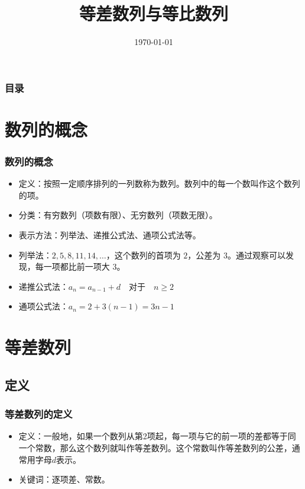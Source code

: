 \documentclass{ctexbeamer}
\title{等差数列与等比数列}
\date{\today}
\begin{document}
\begin{frame}
\titlepage
\end{frame}

\begin{frame}
\frametitle{目录}
\tableofcontents
\end{frame}

\section{数列的概念}
\begin{frame}
\frametitle{数列的概念}
\begin{itemize}
    \item 定义：按照一定顺序排列的一列数称为\alert{数列}。数列中的每一个数叫作这个数列的\alert{项}。
    \item 分类：\alert{有穷数列}（项数有限）、\alert{无穷数列}（项数无限）。
    \item 表示方法：\alert{列举法}、\alert{递推公式法}、\alert{通项公式法}等。
    \item 列举法：$2, 5, 8, 11, 14, \ldots$，这个数列的首项为 \(2\)，公差为 \(3\)。通过观察可以发现，每一项都比前一项大 \(3\)。
    \item 递推公式法：$a_n = a_{n-1} + d \quad \text{对于} \quad n \geq 2$
    \item 通项公式法：$a_n = 2 + 3(n - 1) = 3n - 1$
\end{itemize}
\end{frame}

\section{等差数列}
\subsection{定义}
\begin{frame}
\frametitle{等差数列的定义}
\begin{itemize}
    \item 定义：一般地，如果一个数列从第2项起，每一项与它的前一项的差都等于同一个常数，那么这个数列就叫作\alert{等差数列}。这个常数叫作等差数列的\alert{公差}，通常用字母\alert{$d$}表示。
    \item 关键词：逐项差、常数。
\end{itemize}
\end{frame}

\end{document}
